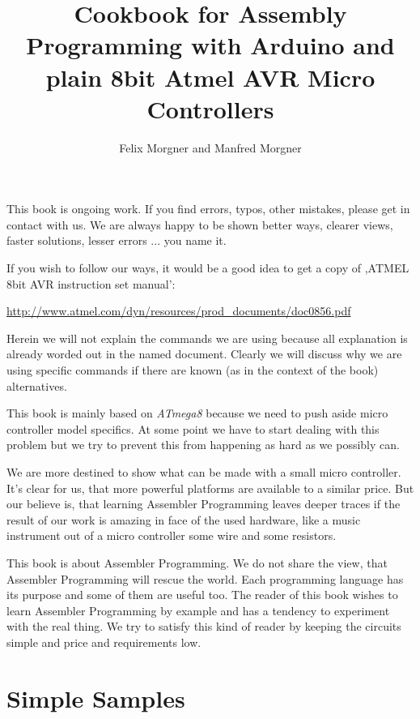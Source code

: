\documentclass[twoside,english,12pt,authoryear,openright]{book}
\newcommand{\at}{\textit{ATmega8} }
\begin{document}

\title{Cookbook for Assembly Programming with Arduino and plain 8bit Atmel AVR Micro Controllers}

\author{Felix Morgner and Manfred Morgner}


\maketitle

This book is ongoing work. If you find errors, typos, other mistakes, please get in contact with us. We are always happy to be shown better ways, clearer views, faster solutions, lesser errors ... you name it.

If you wish to follow our ways, it would be a good idea to get a copy of  ,ATMEL 8bit AVR instruction set manual':

\url{http://www.atmel.com/dyn/resources/prod_documents/doc0856.pdf}

Herein we will not explain the commands we are using because all explanation is already worded out in the named document. Clearly we will discuss why we are using specific commands if there are known (as in the context of the book) alternatives.

This book is mainly based on \at because we need to push aside micro controller model specifics. At some point we have to start dealing with this problem but we try to prevent this from happening as hard as we possibly can.

We are more destined to show what can be made with a small micro controller. It's clear for us, that more powerful platforms are available to a similar price. But our believe is, that learning Assembler Programming leaves deeper traces if the result of our work is amazing in face of the used hardware, like a music instrument out of a micro controller some wire and some resistors.

This book is about Assembler Programming. We do not share the view, that Assembler Programming will rescue the world. Each programming language has its purpose and some of them are useful too. The reader of this book wishes to learn Assembler Programming by example and has a tendency to experiment with the real thing. We try to satisfy this kind of reader by keeping the circuits simple and price and requirements low.


\tableofcontents{}

\part{Simple Samples}
\end{document}
